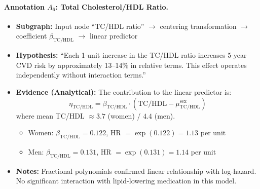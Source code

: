 \documentclass{article}
\begin{document}
\paragraph{Annotation $A_6$: Total Cholesterol/HDL Ratio.}
\begin{itemize}
    \item \textbf{Subgraph:} Input node ``TC/HDL ratio'' $\rightarrow$ centering transformation $\rightarrow$ coefficient $\beta_{\text{TC/HDL}}$ $\rightarrow$ linear predictor
    \item \textbf{Hypothesis:} ``Each 1-unit increase in the TC/HDL ratio increases 5-year CVD risk by approximately 13--14\% in relative terms. This effect operates independently without interaction terms.''
    \item \textbf{Evidence (Analytical):} The contribution to the linear predictor is:
    \[
    \eta_{\text{TC/HDL}} = \beta_{\text{TC/HDL}} \cdot (\text{TC/HDL} - \mu_{\text{TC/HDL}}^{\text{sex}})
    \]
    where mean TC/HDL $\approx 3.7$ (women) / $4.4$ (men).
    \begin{itemize}
        \item Women: $\beta_{\text{TC/HDL}} = 0.122$, HR $= \exp(0.122) = 1.13$ per unit
        \item Men: $\beta_{\text{TC/HDL}} = 0.131$, HR $= \exp(0.131) = 1.14$ per unit
    \end{itemize}
    \item \textbf{Notes:} Fractional polynomials confirmed linear relationship with log-hazard. No significant interaction with lipid-lowering medication in this model.
\end{itemize}
\end{document}
